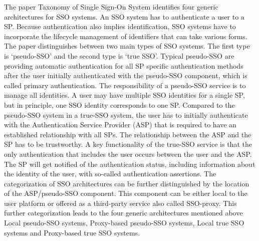 {{{The paper Taxonomy of Single Sign-On System \cite{Pashalidis:2003:10.1007/3-540-45067-X_22} identifies four generic architectures for SSO systems. An SSO system has to authenticate a user to a SP. Because authentication also implies identification, SSO systems have to incorporate the lifecycle management of identifiers that can take various forms. The paper distinguishes between two main types of SSO systems. The first type is ‘pseudo-SSO’ and the second type is ‘true SSO’. Typical pseudo-SSO are providing automatic authentication for all SP specific authentication methods after the user initially authenticated with the pseudo-SSO component, which is called primary authentication. The responsibility of a pseudo-SSO service is to manage all identities. A user may have multiple SSO identities for a single SP, but in principle, one SSO identity corresponds to one SP. Compared to the pseudo-SSO system in a true-SSO system, the user has to initially authenticate with the Authentication Service Provider (ASP) that is required to have an established relationship with all SPs. The relationship between the ASP and the SP has to be trustworthy. A key functionality of the true-SSO service is that the only authentication that includes the user occurs between the user and the ASP. The SP will get notified of the authentication status, including information about the identity of the user, with so-called authentication assertions. The categorization of SSO architectures can be further distinguished by the location of the ASP/pseudo-SSO component. This component can be either local to the user platform or offered as a third-party service also called SSO-proxy. This further categorization leads \cite{Pashalidis:2003:10.1007/3-540-45067-X_22} to the four generic architectures mentioned above Local pseudo-SSO systems, Proxy-based pseudo-SSO systems, Local true SSO systems and Proxy-based true SSO systems.

}}}

